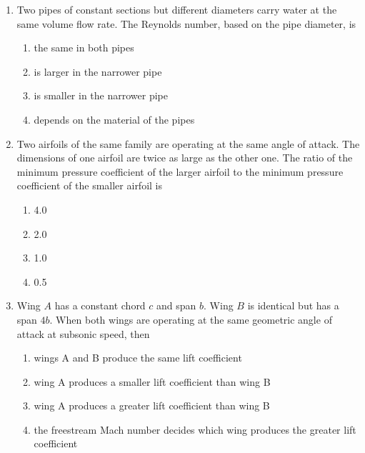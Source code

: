 \documentclass[journal]{IEEEtran}
\begin{document}
\begin{enumerate}
    \item Two pipes of constant sections but different diameters carry water
    at the same volume flow rate. The Reynolds number, based on the pipe diameter, is

    
    \begin{multicols}{2}
        \begin{enumerate}
            \item the same in both pipes
            \item is larger in the narrower pipe
            \item is smaller in the narrower pipe
            \item depends on the material of the pipes
        \end{enumerate}
    \end{multicols}
    
    \item Two airfoils of the same family are operating at the same angle of attack. The
    dimensions of one airfoil are twice as large as the other one. The ratio of the
    minimum pressure coefficient of the larger airfoil to the minimum pressure coefficient
    of the smaller airfoil is

    \begin{multicols}{4}
        \begin{enumerate}
            \item 4.0
            \item 2.0
            \item 1.0
            \item 0.5
        \end{enumerate}
    \end{multicols}

    \item Wing $A$ has a constant chord $c$ and span $b$. Wing $B$ is identical but has a span
    $4b$. When both wings are operating at the same geometric angle of attack at subsonic speed, then

    \begin{enumerate}
        \item wings A and B produce the same lift coefficient
        \item wing A produces a smaller lift coefficient than wing B
        \item wing A produces a greater lift coefficient than wing B
        \item the freestream Mach number decides which wing produces the greater lift coefficient
    \end{enumerate}


\end{enumerate}
\end{document}
